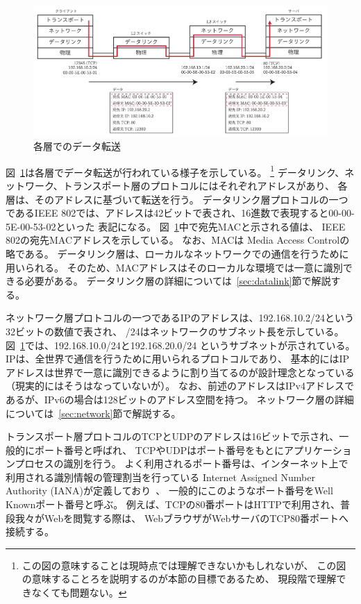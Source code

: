 \begin{figure}[tb]
    \centering
    \includegraphics[width=14cm,pagebox=artbox]{figs/osi_link.pdf}
    \caption{各層でのデータ転送}
    \label{fig:osi_link}
\end{figure}

図~\ref{fig:osi_link}は各層でデータ転送が行われている様子を示している。
\footnote{
この図の意味することは現時点では理解できないかもしれないが、
この図の意味することろを説明するのが本節の目標であるため、
現段階で理解できなくても問題ない。
}
データリンク、ネットワーク、トランスポート層のプロトコルにはそれぞれアドレスがあり、
各層は、そのアドレスに基づいて転送を行う。
データリンク層プロトコルの一つであるIEEE 802では、アドレスは42ビットで表され、16進数で表現すると00-00-5E-00-53-02といった
表記になる。
図~\ref{fig:osi_link}中で宛先MACと示される値は、
IEEE 802の宛先MACアドレスを示している。
なお、MACは Media Access Controlの略である。
データリンク層は、ローカルなネットワークでの通信を行うために用いられる。
そのため、MACアドレスはそのローカルな環境では一意に識別できる必要がある。
データリンク層の詳細については~\ref{sec:datalink}節で解説する。

ネットワーク層プロトコルの一つであるIPのアドレスは、192.168.10.2/24という32ビットの数値で表され、
/24はネットワークのサブネット長を示している。
図~\ref{fig:osi_link}では、192.168.10.0/24と192.168.20.0/24
というサブネットが示されている。
IPは、全世界で通信を行うために用いられるプロトコルであり、
基本的にはIPアドレスは世界で一意に識別できるように割り当てるのが設計理念となっている
（現実的にはそうはなっていないが）。
なお、前述のアドレスはIPv4アドレスであるが、IPv6の場合は128ビットのアドレス空間を持つ。
ネットワーク層の詳細については~\ref{sec:network}節で解説する。

トランスポート層プロトコルのTCPとUDPのアドレスは16ビットで示され、一般的にポート番号と呼ばれ、
TCPやUDPはポート番号をもとにアプリケーションプロセスの識別を行う。
よく利用されるポート番号は、インターネット上で利用される識別情報の管理割当を行っている
Internet Assigned Number Authority (IANA)が定義しており~\cite{wellknown}、
一般的にこのようなポート番号をWell Knownポート番号と呼ぶ。
例えば、TCPの80番ポートはHTTPで利用され、普段我々がWebを閲覧する際は、
WebブラウザがWebサーバのTCP80番ポートへ接続する。

